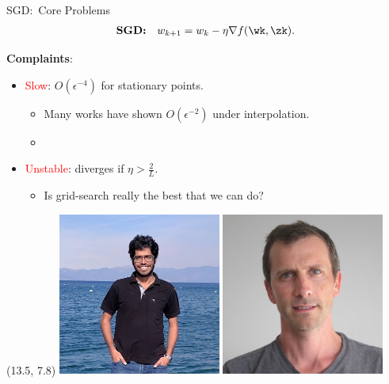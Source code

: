 \documentclass[mathserif,notheorems, hyperref={colorlinks, citecolor=blue, urlcolor=blue, linkcolor=blue}]{beamer}
\def\\{}%
\begin{document}
    \begin{frame}{SGD:\ Core Problems}
        \large 
        \begin{align*}
         \textbf{SGD:} \quad w_{k + 1} = w_k - \eta \nabla f(\wk, \zk). \\
        \end{align*}
        
        \mbox{\Large \textbf{Complaints}:} 

        \vspace{1ex}
        \begin{itemize}
            \item \textcolor{red}{Slow}: \( O(\epsilon^{-4}) \) for stationary points. 
                \vspace{0.5ex}
                \begin{itemize}
                    \item Many works have shown \( O(\epsilon^{-2}) \) under interpolation. 
                    \item \citet{vaswani2019fast, bassily2018exponential, cevher2018linear}
                \end{itemize}
                \vspace{1ex}
            \item \textcolor{red}{Unstable}: diverges if \( \eta > \frac{2}{L} \). 
                \vspace{0.5ex}
                \begin{itemize}
                    \item Is grid-search really the best that we can do? 
                \end{itemize} 
        \end{itemize}
        \vspace{1em}

        \begin{textblock}{2.5}(13.5, 7.8)
            \centering
            \includegraphics[width=0.4\textwidth]{collaborators/sharan}
            \includegraphics[width=0.4\textwidth]{collaborators/francis}


\end{textblock}
\end{frame}
\end{document}
